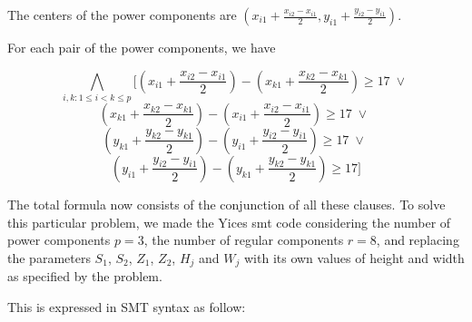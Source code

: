 \begin{description}
  The centers of the power components are $(x_{i1} + \frac{x_{i2} - x_{i1}}{2}, y_{i1} + \frac{y_{i2} - y_{i1}}{2} )$.

  For each pair of the power components, we have

  \[  \bigwedge_{i,k: 1 \leq i < k \leq p}
  [ (x_{i1} + \frac{x_{i2} - x_{i1}}{2}) - (x_{k1} + \frac{x_{k2} - x_{k1}}{2}) \geq 17 \; \vee \; \]
  \[ (x_{k1} + \frac{x_{k2} - x_{k1}}{2}) - (x_{i1} + \frac{x_{i2} - x_{i1}}{2}) \geq 17 \; \vee \; \]
  \[ (y_{k1} + \frac{y_{k2} - y_{k1}}{2}) - (y_{i1} + \frac{y_{i2} - y_{i1}}{2}) \geq 17 \; \vee \; \]
  \[ (y_{i1} + \frac{y_{i2} - y_{i1}}{2}) - (y_{k1} + \frac{y_{k2} - y_{k1}}{2}) \geq 17 ] \]


\end{description}

The total formula now consists of the conjunction of all these clauses. To solve this particular problem, we made the Yices smt code considering the number of power components $p=3$, the number of regular components $r=8$, and replacing the parameters $S_1$, $S_2$, $Z_1$, $Z_2$, $H_j$ and $W_j$ with its own values of height and width as specified by the problem.

This is expressed in SMT syntax as follow:

